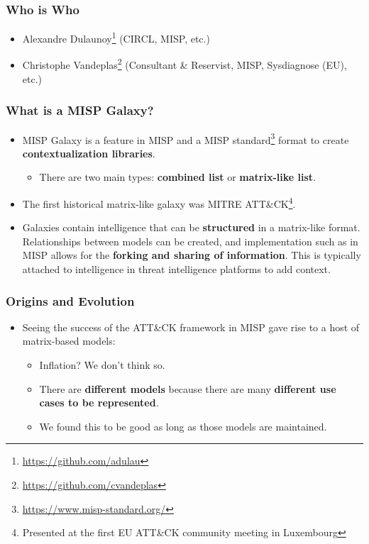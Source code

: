 
\begin{frame}
\titlepage
\end{frame}

\begin{frame}
        \frametitle{Who is Who}
        \begin{itemize}
            \item Alexandre Dulaunoy\footnote{\url{https://github.com/adulau}} (CIRCL, MISP, etc.)
            \item Christophe Vandeplas\footnote{\url{https://github.com/cvandeplas}} (Consultant \& Reservist, MISP, Sysdiagnose (EU), etc.)
        \end{itemize}
\end{frame}

\begin{frame}
  \frametitle{What is a MISP Galaxy?}
  \begin{itemize}
	  \item MISP Galaxy is a feature in MISP and a MISP standard\footnote{\url{https://www.misp-standard.org/}} format to create {\bf contextualization libraries}.
    \begin{itemize}
      \item There are two main types: \textbf{combined list} or \textbf{matrix-like list}.
    \end{itemize}
    \item The first historical matrix-like galaxy was MITRE ATT\&CK\footnote{Presented at the first EU ATT\&CK community meeting in Luxembourg}.
    \item Galaxies contain intelligence that can be \textbf{structured} in a matrix-like format. Relationships between models can be created, and implementation such as in MISP allows for the \textbf{forking and sharing of information}. This is typically attached to intelligence in threat intelligence platforms to add context.
  \end{itemize}
\end{frame}


\begin{frame}
   \frametitle{Origins and Evolution}
   \begin{itemize}
       \item Seeing the success of the ATT\&CK framework in MISP gave rise to a host of matrix-based models:
       \begin{itemize}
           \item Inflation? We don’t think so.
           \item There are {\bf different models} because there are many {\bf different use cases to be represented}.
           \item We found this to be good as long as those models are maintained.
       \end{itemize}
   \end{itemize}
\end{frame}

